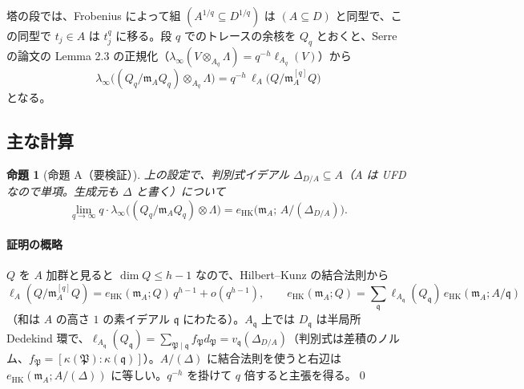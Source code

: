 \documentclass[11pt,a4paper]{ltjsarticle}
\theoremstyle{plain}
\theoremstyle{definition}
\theoremstyle{remark}
\theoremstyle{plain}
\newtheorem*{proposition*}{命題}
\newcommand{\m}{\mathfrak{m}}
\newcommand{\eHK}{e_{\mathrm{HK}}}
\begin{document}
塔の段では、Frobenius によって組 $(A^{1/q}\subseteq D^{1/q})$ は $(A\subseteq D)$ と同型で、この同型で $t_j\in A$ は $t_j^q$ に移る。段 $q$ でのトレースの余核を $Q_q$ とおくと、Serre の論文の Lemma 2.3 の正規化（$\lambda_\infty(V\otimes_{A_q}\Lambda) = q^{-h}\ell_{A_q}(V)$）から
\[
  \lambda_\infty\bigl((Q_q/\m_AQ_q)\otimes_{A_q}\Lambda\bigr) = q^{-h}\,\ell_A\bigl(Q/\m_A^{[q]}Q\bigr)
\]
となる。

\subsection{主な計算}
\begin{proposition*}[命題 A（要検証）]
上の設定で、判別式イデアル $\Delta_{D/A}\subseteq A$（$A$ は UFD なので単項。生成元も $\Delta$ と書く）について
\[
  \lim_{q\to\infty} q\cdot\lambda_\infty\bigl((Q_q/\m_AQ_q)\otimes\Lambda\bigr) = \eHK\bigl(\m_A;\,A/(\Delta_{D/A})\bigr).
\]
\end{proposition*}
\paragraph{証明の概略}
$Q$ を $A$ 加群と見ると $\dim Q\le h-1$ なので、Hilbert--Kunz の結合法則から
\[
  \ell_A(Q/\m_A^{[q]}Q) = \eHK(\m_A;Q)\,q^{h-1}+o(q^{h-1}),\qquad
  \eHK(\m_A;Q) = \sum_{\mathfrak{q}}\ell_{A_\mathfrak{q}}(Q_\mathfrak{q})\,\eHK(\m_A;A/\mathfrak{q})
\]
（和は $A$ の高さ $1$ の素イデアル $\mathfrak{q}$ にわたる）。$A_\mathfrak{q}$ 上では $D_\mathfrak{q}$ は半局所 Dedekind 環で、$\ell_{A_\mathfrak{q}}(Q_\mathfrak{q}) = \sum_{\mathfrak{P}\mid\mathfrak{q}}f_\mathfrak{P}d_\mathfrak{P} = v_\mathfrak{q}(\Delta_{D/A})$（判別式は差積のノルム、$f_\mathfrak{P} = [\kappa(\mathfrak{P}):\kappa(\mathfrak{q})]$）。$A/(\Delta)$ に結合法則を使うと右辺は $\eHK(\m_A;A/(\Delta))$ に等しい。$q^{-h}$ を掛けて $q$ 倍すると主張を得る。\qed
\end{document}
